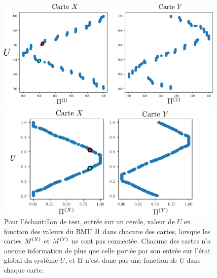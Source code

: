 \begin{figure}
\begin{minipage}{0.5\textwidth}
\includegraphics[width = \textwidth]{XU_YU.pdf}
\caption{Valeur de $U$ en fonction des valeurs du BMU $\bmu\m{i}$ dans chacune des cartes, pour des entrées prises sur le cercle. On voit que $U$ est une fonction de la position du BMU dans chaque carte, contrairement au cas ou les cartes apprendraient indépendamment sur les mêmes entrées, voir figure \ref{fig:piu_indep}.}
\label{fig:piu}
\end{minipage}
\hfill
\begin{minipage}{0.45\textwidth}
\centering
\includegraphics[width = \textwidth]{xu_yu_unco.pdf}
\caption{Pour l'échantillon de test, entrée sur un cercle, valeur de $U$ en fonction des valeurs du BMU $\Pi$ dans chacune des cartes, lorsque les cartes $M^{({X})}$ et $M^{({Y})}$ ne sont pas connectée. Chacune des cartes n'a aucune information de plus que celle portée par son entrée sur l'état global du système $U$, et $\Pi$ n'est donc pas une fonction de $U$ dans chaque carte. }
\label{fig:piu_indep}
\end{minipage}

\end{figure}


